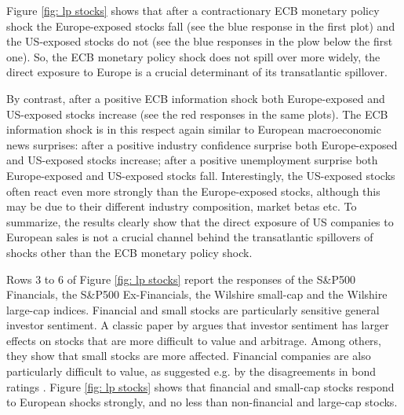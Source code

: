 \documentclass[a4paper,12pt]{article}
\begin{document}
Figure \ref{fig: lp stocks} shows that after a contractionary ECB monetary policy shock the Europe-exposed stocks fall (see the blue response in the first plot) and the US-exposed stocks do not (see the blue responses in the plow below the first one). So, the ECB monetary policy shock does not spill over more widely, the direct exposure to Europe is a crucial determinant of its transatlantic spillover.

By contrast, after a positive ECB information shock both Europe-exposed and US-exposed stocks increase (see the red responses in the same plots).
The ECB information shock is in this respect again similar to European macroeconomic news surprises:
after a positive industry confidence surprise both Europe-exposed and US-exposed stocks increase;
after a positive unemployment surprise both Europe-exposed and US-exposed stocks fall.
Interestingly, the US-exposed stocks often react even more strongly than the Europe-exposed stocks,
although this may be due to their different industry composition, market betas etc.
To summarize, the results clearly show that the direct exposure of US companies to European sales is not a crucial channel behind the transatlantic spillovers of shocks other than the ECB monetary policy shock.%

Rows 3 to 6 of Figure \ref{fig: lp stocks} report the responses of
the S\&P500 Financials, the S\&P500 Ex-Financials, the Wilshire small-cap and the Wilshire large-cap indices.
Financial and small stocks are particularly sensitive general investor sentiment.
A classic paper by \cite{Baker_Wurgler_2006} argues that investor sentiment has larger effects on stocks that are more difficult to value and arbitrage. Among others, they show that small stocks are more affected. Financial companies are also particularly difficult to value, as suggested e.g. by the
disagreements in bond ratings \citep{Morgan_2002}.
Figure \ref{fig: lp stocks} shows that financial and small-cap stocks respond to European shocks strongly, and no less than non-financial and large-cap stocks.
\end{document}
